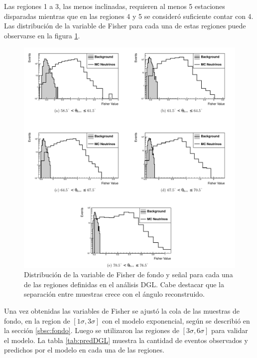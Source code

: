 	Las regiones 1 a 3, las menos inclinadas, requieren al menos 5 estaciones disparadas mientras que en las regiones 4 y 5 se consideró suficiente contar con 4.
	Las distribución de la variable de Fisher para cada una de estas regiones puede observarse en la figura \ref{fig:fisherDGL}.
	\begin{figure}[ht]
	\begin{center}
	\includegraphics[width=\textwidth]{fig/seleccionAuger/fisherDGL}
	\caption{Distribuci\'on de la variable de Fisher de fondo y se\~nal para cada una de las regiones definidas en el an\'alisis DGL. Cabe destacar que la separación entre muestras crece con el ángulo reconstruido.}
	\label{fig:fisherDGL}
	\end{center}
	\end{figure}
	Una vez obtenidas las variables de Fisher se ajustó la cola de las muestras de fondo, en la region de  $[1\sigma, 3\sigma]$ con el modelo exponencial, según se describió en la sección \ref{sbsc:fondo}.
	Luego se utilizaron las regiones de $[3\sigma, 6\sigma]$ para validar el modelo.
	La tabla \ref{tab:predDGL} muestra la cantidad de eventos observados y predichos por el modelo en cada una de las regiones.
